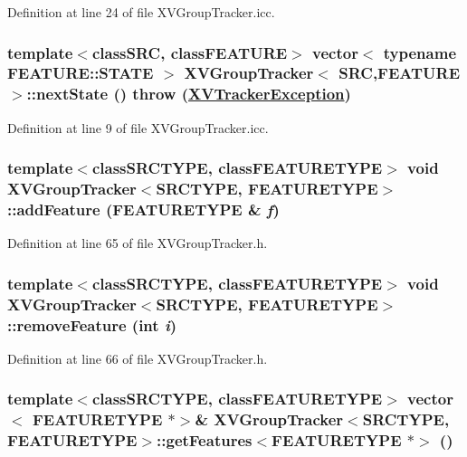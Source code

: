 Definition at line 24 of file XVGroup\-Tracker.icc.\label{XVGroupTracker_a3}
\hypertarget{class_XVGroupTracker_a3}{
\subsubsection[nextState]{\setlength{\rightskip}{0pt plus 5cm}template$<$classSRC, classFEATURE$>$ vector$<$ typename FEATURE::STATE $>$ XVGroup\-Tracker$<$ SRC,FEATURE $>$::next\-State ()  throw (\hyperlink{class_XVTrackerException}{XVTracker\-Exception})}}




Definition at line 9 of file XVGroup\-Tracker.icc.\label{XVGroupTracker_a4}
\hypertarget{class_XVGroupTracker_a4}{
\subsubsection[addFeature]{\setlength{\rightskip}{0pt plus 5cm}template$<$classSRCTYPE, classFEATURETYPE$>$ void XVGroup\-Tracker$<$SRCTYPE, FEATURETYPE$>$::add\-Feature (FEATURETYPE \& {\em f})}}




Definition at line 65 of file XVGroup\-Tracker.h.\label{XVGroupTracker_a5}
\hypertarget{class_XVGroupTracker_a5}{
\subsubsection[removeFeature]{\setlength{\rightskip}{0pt plus 5cm}template$<$classSRCTYPE, classFEATURETYPE$>$ void XVGroup\-Tracker$<$SRCTYPE, FEATURETYPE$>$::remove\-Feature (int {\em i})}}




Definition at line 66 of file XVGroup\-Tracker.h.\label{XVGroupTracker_a6}
\hypertarget{class_XVGroupTracker_a6}{
\subsubsection[getFeatures]{\setlength{\rightskip}{0pt plus 5cm}template$<$classSRCTYPE, classFEATURETYPE$>$ vector$<$ FEATURETYPE $\ast$$>$\& XVGroup\-Tracker$<$SRCTYPE, FEATURETYPE$>$::get\-Features$<$FEATURETYPE $\ast$$>$ ()}}




